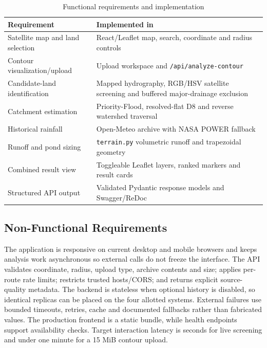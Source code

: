 \documentclass[manuscript,screen,review]{acmart}
\begin{document}
\begin{table}[h]
  \caption{Functional requirements and implementation}
  \label{tab:requirements}
  \begin{tabular}{p{3.7cm}p{4.8cm}}
    \toprule
    Requirement & Implemented in \\
    \midrule
    Satellite map and land selection & React/Leaflet map, search, coordinate and radius controls \\
    Contour visualization/upload & Upload workspace and \texttt{/api/analyze-contour} \\
    Candidate-land identification & Mapped hydrography, RGB/HSV satellite screening and buffered major-drainage exclusion \\
    Catchment estimation & Priority-Flood, resolved-flat D8 and reverse watershed traversal \\
    Historical rainfall & Open-Meteo archive with NASA POWER fallback \\
    Runoff and pond sizing & \texttt{terrain.py} volumetric runoff and trapezoidal geometry \\
    Combined result view & Toggleable Leaflet layers, ranked markers and result cards \\
    Structured API output & Validated Pydantic response models and Swagger/ReDoc \\
    \bottomrule
  \end{tabular}
\end{table}

\subsection{Non-Functional Requirements}
The application is responsive on current desktop and mobile browsers and keeps analysis work asynchronous so external calls do not freeze the interface. The API validates coordinate, radius, upload type, archive contents and size; applies per-route rate limits; restricts trusted hosts/CORS; and returns explicit source-quality metadata. The backend is stateless when optional history is disabled, so identical replicas can be placed on the four allotted systems. External failures use bounded timeouts, retries, cache and documented fallbacks rather than fabricated values. The production frontend is a static bundle, while health endpoints support availability checks. Target interaction latency is seconds for live screening and under one minute for a 15 MiB contour upload.
\end{document}
